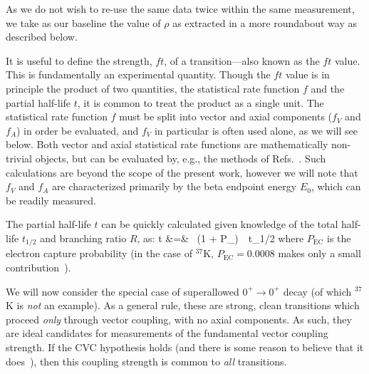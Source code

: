 As we do not wish to re-use the same data twice within the same measurement, we take as our baseline the value of $\rho$ as extracted in a more roundabout way as described below.


It is useful to define the strength, $ft$, of a transition---also known as the $ft$ value.  This is fundamentally an experimental quantity.  Though the $ft$ value is in principle the product of two quantities, the statistical rate function $f$ and the partial half-life $t$, it is common to treat the product as a single unit.  
%
The statistical rate function $f$ must be split into vector and axial components ($f_V$ and $f_A$) in order be evaluated, and $f_V$ in particular is often used alone, as we will see below.  Both vector and axial statistical rate functions are mathematically non-trivial objects\cite{towner_hardy_1995_frombook}\cite{HardyTowner2005_Superallowed}, but can be evaluated by, e.g., the methods of Refs.~\cite{wilkinson2}\cite{wilkinson3}\cite{wilkinson4}.  
Such calculations are beyond the scope of the present work, however we will note that 
$f_V$ and $f_A$ are characterized primarily by the beta endpoint energy $E_0$, which can be readily measured.  

The partial half-life $t$ can be quickly calculated given knowledge of the total half-life $t_{1/2}$ and branching ratio $R$, as:
\bea
t &=&   \, (1 + P_{}) \,\, t_{1/2}
\eea
where $P_{\mathrm{EC}}$ is the electron capture probability (in the case of $^{37}$K, $P_{\mathrm{EC}}=0.0008$ makes only a small contribution~\cite{SeverijnsTandecki2008}).

We will now consider the special case of superallowed $0^+ \rightarrow 0^+$ decay (of which $^{37}$K is \emph{not} an example).  As a general rule, these are strong, clean transitions which proceed \emph{only} through vector coupling, with no axial components.  As such, they are 
ideal candidates for measurements of the fundamental vector coupling strength.
If the \ac{CVC} hypothesis holds (and there is some reason to believe that it does~\cite{severijns2006}\cite{HardyTownerSuperallowed2020}), then this coupling strength is common to \emph{all} transitions.



